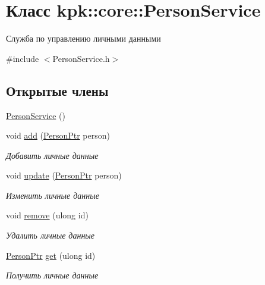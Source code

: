 \hypertarget{classkpk_1_1core_1_1_person_service}{}\section{Класс kpk\+:\+:core\+:\+:Person\+Service}
\label{classkpk_1_1core_1_1_person_service}


Служба по управлению личными данными  




{\ttfamily \#include $<$Person\+Service.\+h$>$}

\subsection*{Открытые члены}
\begin{DoxyCompactItemize}
\item 
\hyperlink{classkpk_1_1core_1_1_person_service_a4c4a362520b4017ad471ea8ac66b94c4}{Person\+Service} ()
\item 
void \hyperlink{classkpk_1_1core_1_1_person_service_ad9944affacfbf9e54bb0292c075f9cd4}{add} (\hyperlink{namespacekpk_1_1core_a4a1c110098ffdfb42bdcba45c4d9a7fe}{Person\+Ptr} person)
\begin{DoxyCompactList}\small\item\em Добавить личные данные \end{DoxyCompactList}\item 
void \hyperlink{classkpk_1_1core_1_1_person_service_a98a60349c8aeb570be80116e67814c65}{update} (\hyperlink{namespacekpk_1_1core_a4a1c110098ffdfb42bdcba45c4d9a7fe}{Person\+Ptr} person)
\begin{DoxyCompactList}\small\item\em Изменить личные данные \end{DoxyCompactList}\item 
void \hyperlink{classkpk_1_1core_1_1_person_service_a42c2e03d47b6002dc35190a7b904717d}{remove} (ulong id)
\begin{DoxyCompactList}\small\item\em Удалить личные данные \end{DoxyCompactList}\item 
\hyperlink{namespacekpk_1_1core_a4a1c110098ffdfb42bdcba45c4d9a7fe}{Person\+Ptr} \hyperlink{classkpk_1_1core_1_1_person_service_a3dbe80fc1ca2e472c23f5615f93e56ca}{get} (ulong id)
\begin{DoxyCompactList}\small\item\em Получить личные данные \end{DoxyCompactList}\item 

\end{DoxyCompactItemize}
